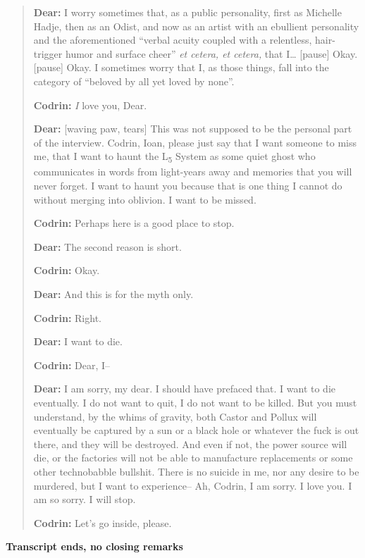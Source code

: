\begin{quote}
\textbf{Dear:} I worry sometimes that, as a public personality, first as Michelle Hadje, then as an Odist, and now as an artist with an ebullient personality and the aforementioned ``verbal acuity coupled with a relentless, hair-trigger humor and surface cheer'' \emph{et cetera, et cetera,} that I\ldots{} {[}pause{]} Okay. {[}pause{]} Okay. I sometimes worry that I, as those things, fall into the category of ``beloved by all yet loved by none''.

\textbf{Codrin:} \emph{I} love you, Dear.

\textbf{Dear:} {[}waving paw, tears{]} This was not supposed to be the personal part of the interview. Codrin, Ioan, please just say that I want someone to miss me, that I want to haunt the L\textsubscript{5} System as some quiet ghost who communicates in words from light-years away and memories that you will never forget. I want to haunt you because that is one thing I cannot do without merging into oblivion. I want to be missed.

\textbf{Codrin:} Perhaps here is a good place to stop.

\textbf{Dear:} The second reason is short.

\textbf{Codrin:} Okay.

\textbf{Dear:} And this is for the myth only.

\textbf{Codrin:} Right.

\textbf{Dear:} I want to die.

\textbf{Codrin:} Dear, I--

\textbf{Dear:} I am sorry, my dear. I should have prefaced that. I want to die eventually. I do not want to quit, I do not want to be killed. But you must understand, by the whims of gravity, both Castor and Pollux will eventually be captured by a sun or a black hole or whatever the fuck is out there, and they will be destroyed. And even if not, the power source will die, or the factories will not be able to manufacture replacements or some other technobabble bullshit. There is no suicide in me, nor any desire to be murdered, but I want to experience-- Ah, Codrin, I am sorry. I love you. I am so sorry. I will stop.

\textbf{Codrin:} Let's go inside, please.
\end{quote}

\textbf{Transcript ends, no closing remarks}
